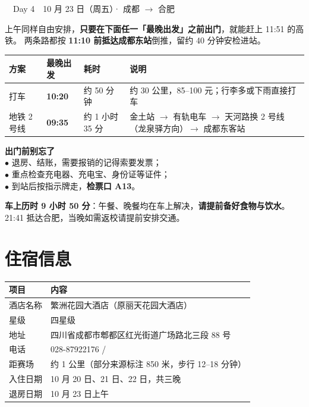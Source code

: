 \documentclass[11pt,a4paper,fontset=windows]{ctexart}
\newcommand{\thd}[1]{\textbf{\color{main}#1}}   %
\newcommand{\daytitle}[2]{%
  \vspace{0.7em}
  {\large\bfseries\color{white}\colorbox{main}{\strut\ \ #1\ \ \normalsize #2\ \ }}%
  \vspace{0.35em}\par}
\begin{document}
\daytitle{Day 4}{10 月 23 日（周五）· 成都 $\rightarrow$ 合肥}\label{sec:day4}

上午同样自由安排，\textbf{只要在下面任一「最晚出发」之前出门}，就能赶上 11:51 的高铁。
两条路都按 \textbf{11:10 前抵达成都东站}倒推，留约 40 分钟安检进站。

\begin{center}
\begin{tabularx}{\textwidth}{@{}L{2.3cm}L{1.9cm}L{2.8cm}X@{}}
\toprule
\thd{方案} & \thd{最晚出发} & \thd{耗时} & \thd{说明}\\
\midrule
打车 & \textbf{10:20} & 约 50 分钟 & 约 30 公里，85--100 元；行李多或下雨直接打车\\
地铁 2 号线 & \textbf{09:35} & 约 1 小时 35 分 & 金土站 $\rightarrow$ 有轨电车 $\rightarrow$ 天河路换 2 号线（龙泉驿方向）$\rightarrow$ 成都东客站\\
\bottomrule
\end{tabularx}
\end{center}

\begin{keybox}
\textbf{出门前别忘了}\\
$\bullet$ 退房、结账，需要报销的记得索要发票；\\
$\bullet$ 重点检查充电器、充电宝、身份证等证件；\\
$\bullet$ 到站后按指示牌走，\textbf{检票口 A13}。
\end{keybox}

\begin{warnbox}
\textbf{车上历时 9 小时 50 分}：午餐、晚餐均在车上解决，\textbf{请提前备好食物与饮水}。
21:41 抵达合肥，当晚如需返校请提前安排交通。
\end{warnbox}

\section{住宿信息}

\begin{center}
\begin{tabularx}{\textwidth}{@{}L{3.0cm}X@{}}
\toprule
\thd{项目} & \thd{内容}\\
\midrule
酒店名称 & 繁洲花园大酒店（原丽天花园大酒店）\\
星级 & 四星级\\
地址 & 四川省成都市郫都区红光街道广场路北三段 88 号\\
电话 & 028-87922176 \quad/\\
距赛场 & 约 1 公里（部分来源标注 850 米，步行 12--18 分钟）\\
入住日期 & 10 月 20 日、21 日、22 日，共三晚\\
退房日期 & 10 月 23 日上午\\
\bottomrule
\end{tabularx}
\end{center}
\end{document}
